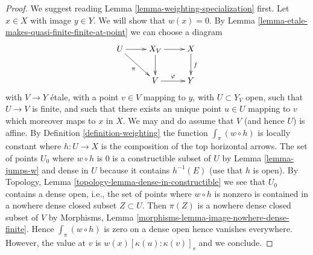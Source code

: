 \documentclass[10pt,a4paper]{amsart}
\theoremstyle{plain}
\theoremstyle{definition}
\theoremstyle{remark}
\numberwithin{equation}{subsection}
\begin{document}
\begin{proof}
We suggest reading Lemma \ref{lemma-weighting-specialization} first.
Let $x \in X$ with image $y \in Y$. We will show that $w(x) = 0$. By
Lemma \ref{lemma-etale-makes-quasi-finite-finite-at-point}
we can choose a diagram
$$
\xymatrix{
U \ar[r] \ar[dr]_\pi & X_V \ar[d] \ar[r] & X \ar[d]^f \\
& V \ar[r]^\varphi & Y
}
$$
with $V \to Y$ \'etale, with a point $v \in V$ mapping to $y$,
with $U \subset Y_V$ open, such that $U \to V$ is finite, and
such that there exists an unique point $u \in U$ mapping to $v$
which moreover maps to $x$ in $X$. We may and do assume that $V$
(and hence $U$) is affine. By Definition \ref{definition-weighting}
the function $\int_\pi (w \circ h)$ is locally constant where
$h : U \to X$ is the composition of the top horizontal arrows.
The set of points $U_0$ where $w \circ h$ is $0$ is a
constructible subset of $U$ by Lemma \ref{lemma-jumps-w}
and dense in $U$ because it contains $h^{-1}(E)$ (use that $h$ is open).
By Topology, Lemma \ref{topology-lemma-dense-in-constructible}
we see that $U_0$ contains a dense open,
i.e., the set of points where $w \circ h$ is nonzero is contained
in a nowhere dense closed subset $Z \subset U$. Then $\pi(Z)$
is a nowhere dense closed subset of $V$ by
Morphisms, Lemma \ref{morphisms-lemma-image-nowhere-dense-finite}.
Hence $\int_\pi (w \circ h)$ is zero on a dense open hence
vanishes everywhere.
However, the value at $v$ is $w(x)[\kappa(u):\kappa(v)]_s$
and we conclude.
\end{proof}
\end{document}
